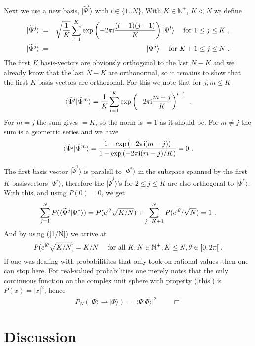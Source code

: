 \documentclass[12pt]{article}
\def\beqn{\begin{eqnarray}}
\def\eeqn{\end{eqnarray}}
\begin{document}
Next we use a new basis, $|\widetilde \Psi^i \rangle$ with $i \in \{1..N \}$. With $K \in {\mathbb{N}}^+$, $K < N$ we define
\beqn
| \widetilde \Psi^j \rangle &:=& \sqrt{\frac{1}{K}} \sum_{l=1}^K \exp \left( -2 \pi {\rm i} \frac{(l-1) (j-1)}{K} \right) |\Psi^l \rangle  ~~~~{\mbox{for}}~1 \leq j \leq K~, \nonumber\\
| \widetilde \Psi^j \rangle &:=& |\Psi^j \rangle ~~~~{\mbox{for}}~K+1 \leq j \leq N~. \label{tildebasis}
\eeqn
The first $K$ basis-vectors are obviously orthogonal to the last $N-K$ and we already know that the last $N-K$ are orthonormal, so it remains to show that the first $K$ basis vectors are orthogonal. For this we note that for $j,m \leq K$
\beqn
\langle \widetilde \Psi^j | \widetilde \Psi^m \rangle 
= \frac{1}{K} \sum_{l=1}^ K        
\exp \left( -2 \pi {\rm i} \frac{m-j}{K} \right)^{l-1} ~.
\eeqn
For $m=j$ the sum gives $=K$, so the norm is $=1$ as it should be. For $m \neq j$ the sum is a geometric series and we have
\beqn
\langle \widetilde \Psi^j | \widetilde \Psi^m \rangle = \frac{ 1- \exp \left( -2 \pi {\rm i} (m-j)\right)} {1- \exp \left( -2 \pi {\rm i} (m-j) /K \right)  } =0 ~.
\eeqn

The first basis vector $|\widetilde \Psi^1 \rangle$ is paralell to $|\Psi^* \rangle$ in the subspace spanned by the first $K$ basisvectors $|\Psi^i \rangle$, therefore the $|\widetilde \Psi^j \rangle$'s for $2\leq j \leq K$ are also orthogonal to $|\Psi^*\rangle$. With this, and using $P(0) = 0$, we get
\beqn
\sum_{j=1}^N P (\langle \widetilde \Psi^j | \Psi^* \rangle) = P( e^{{\rm i} \theta}  \sqrt{K/N} ) + \sum_{j=K+1}^N P (  e^{{\rm i} \theta}  /\sqrt{N}) = 1~.
\eeqn
And by using (\ref{1/N}) we arrive at
\beqn
P ( e^{{\rm i} \theta} \sqrt{K/N} ) = K/N ~~~~\forall~ K,N \in {\mathbb{N^+}}, K \leq N, \theta \in [0, 2 \pi [~. \label{this}
\eeqn
If one was dealing with probabilitites that only took on rational values, then one can stop here. For real-valued probabilities one merely notes that
the only continuous function on the complex unit sphere with property (\ref{this}) is $P(x) = |x|^2$, hence
\beqn
P_N ( |\Psi \rangle \to |\Phi \rangle) = |\langle \Psi | \Phi \rangle|^2 ~~~~~~~~~~ \Box
\eeqn


\section{Discussion}
\end{document}
